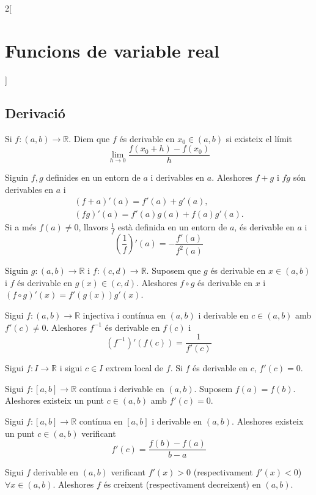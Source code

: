 \documentclass[../../../main.tex]{subfiles}
\begin{document}
\begin{multicols}{2}[\section{Funcions de variable real}]
\subsection{Derivació}
\begin{definition}
Si $f:(a,b)\rightarrow\mathbb{R}$. Diem que $f$ és derivable en $x_0\in(a,b)$ si existeix el límit $$\lim_{h\to 0}\frac{f(x_0+h)-f(x_0)}{h}$$
\end{definition}
\begin{prop}
Siguin $f,g$ definides en un entorn de $a$ i derivables en $a$. Aleshores $f+g$ i $fg$ són derivables en $a$ i \begin{gather*}
    (f+a)'(a)=f'(a)+g'(a),\\
    (fg)'(a)=f'(a)g(a)+f(a)g'(a).
\end{gather*} Si a més $f(a)\ne 0$, llavors $\frac{1}{f}$ està definida en un entorn de $a$, és derivable en $a$ i $$\left(\frac{1}{f}\right)'(a)=-\frac{f'(a)}{f^2(a)}$$
\end{prop}
\begin{prop}
Siguin $g:(a,b)\rightarrow\mathbb{R}$ i $f:(c,d)\rightarrow\mathbb{R}$. Suposem que $g$ és derivable en $x\in(a,b)$ i $f$ és derivable en $g(x)\in(c,d)$. Aleshores $f\circ g$ és derivable en $x$ i $(f\circ g)'(x)=f'(g(x))g'(x)$.
\end{prop}
\begin{prop}
Sigui $f:(a,b)\rightarrow\mathbb{R}$ injectiva i contínua en $(a,b)$ i derivable en $c\in(a,b)$ amb $f'(c)\ne 0$. Aleshores $f^{-1}$ és derivable en $f(c)$ i $$(f^{-1})'(f(c))=\frac{1}{f'(c)}$$
\end{prop}
\begin{prop}
Sigui $f:I\rightarrow\mathbb{R}$ i sigui $c\in I$ extrem local de $f$. Si $f$ és derivable en $c$, $f'(c)=0$.
\end{prop}
\begin{theorem}
Sigui $f:[a,b]\rightarrow\mathbb{R}$ contínua i derivable en $(a,b)$. Suposem $f(a)=f(b)$. Aleshores existeix un punt $c\in (a,b)$ amb $f'(c)=0$.
\end{theorem}
\begin{theorem}
Sigui $f:[a,b]\rightarrow\mathbb{R}$ contínua en $[a,b]$ i derivable en $(a,b)$. Aleshores existeix un punt $c\in (a,b)$ verificant $$f'(c)=\frac{f(b)-f(a)}{b-a}$$
\end{theorem}
\begin{corollary}
Sigui $f$ derivable en $(a,b)$ verificant $f'(x)>0$ (respectivament $f'(x)<0$) $\forall x\in(a,b)$. Aleshores $f$ és creixent (respectivament decreixent) en $(a,b)$.

\end{corollary}
\end{multicols}
\end{document}
